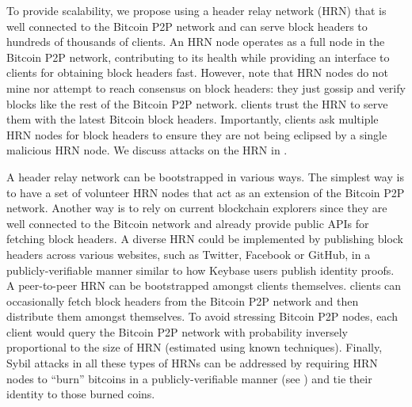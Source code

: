 To provide scalability, we propose using a header relay network (HRN) that is well connected to the Bitcoin P2P network and can serve block headers to hundreds of thousands of \Sys clients.
An HRN node operates as a full node in the Bitcoin P2P network, contributing to its health while providing an interface to \Sys clients for obtaining block headers fast.
However, note that HRN nodes do not mine nor attempt to reach consensus on block headers: they just gossip and verify blocks like the rest of the Bitcoin P2P network.
\Sys clients trust the HRN to serve them with the latest Bitcoin block headers.
Importantly, clients ask multiple HRN nodes for block headers to ensure they are not being eclipsed by a single malicious HRN node.
We discuss attacks on the HRN in .

A header relay network can be bootstrapped in various ways.
The simplest way is to have a set of volunteer HRN nodes that act as an extension of the Bitcoin P2P network.
Another way is to rely on current blockchain explorers\cite{bitcoin-blockchaindotinfo, bitcoin-blockexplorerdotcom, bitcoin-blockrdotio,bitcoin-blocktraildotcom} since they are well connected to the Bitcoin network and already provide public APIs for fetching block headers.
A diverse HRN could be implemented by publishing block headers across various websites, such as Twitter, Facebook or GitHub, in a publicly-verifiable manner similar to how Keybase\cite{keybase} users publish identity proofs.
A peer-to-peer HRN can be bootstrapped amongst \Sys clients themselves.
\Sys clients can occasionally fetch block headers from the Bitcoin P2P network and then distribute them amongst themselves.
To avoid stressing Bitcoin P2P nodes, each client would query the Bitcoin P2P network with probability inversely proportional to the size of HRN (estimated using known techniques\cite{p2p-size-estimation}).
Finally, Sybil attacks\cite{sybil} in all these types of HRNs can be addressed by requiring HRN nodes to ``burn'' bitcoins in a publicly-verifiable manner (see ) and tie their identity to those burned coins.



